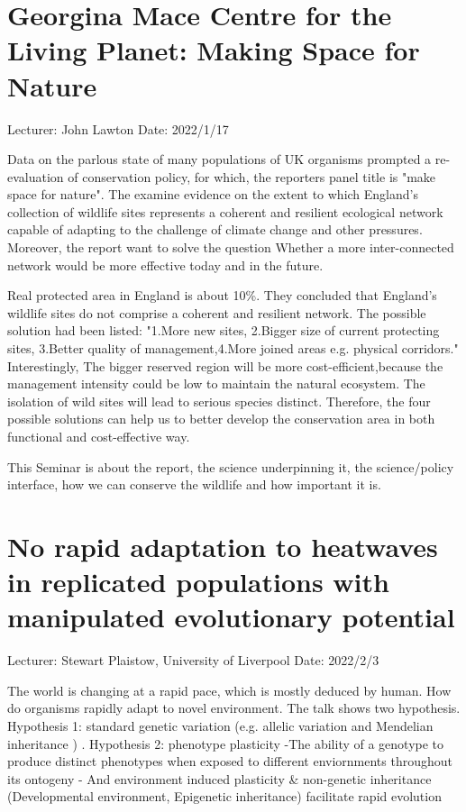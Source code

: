 \documentclass[11pt]{article}
\begin{document}
   
\newpage


\section{Georgina Mace Centre for the Living Planet: Making Space for Nature}
Lecturer: John Lawton
\newline
Date: 2022/1/17
\newline

Data on the parlous state of many populations of UK organisms prompted a re-evaluation of conservation policy, for which, the reporters panel title is "make space for nature". The examine evidence on the extent to which England's collection of wildlife sites represents a coherent and resilient ecological network capable of adapting to the challenge of climate change and other pressures. Moreover, the report want to solve the question Whether a more inter-connected network would be more effective today and in the future.

Real protected area in England is about 10\%. They concluded that England's wildlife sites do not comprise a coherent and resilient network. The possible solution had been listed: "1.More new sites, 2.Bigger size of current protecting sites, 3.Better quality of management,4.More joined areas e.g. physical corridors." Interestingly, The bigger reserved region will be more cost-efficient,because the management intensity could be low to maintain the natural ecosystem. The isolation of wild sites will lead to serious species distinct. Therefore, the four possible solutions can help us to better develop the conservation area in both functional and cost-effective way.

This Seminar is about the report, the science underpinning it, the science/policy interface, how we can conserve the wildlife and how important it is.


\newpage






\section{No rapid adaptation to heatwaves in replicated populations with manipulated evolutionary potential}
Lecturer:  Stewart Plaistow, University of Liverpool
\newline
Date: 2022/2/3
\newline

The world is changing at a rapid pace, which is mostly deduced by human. How do organisms rapidly adapt to novel environment. The talk shows two hypothesis. Hypothesis 1: standard genetic variation (e.g. allelic variation and Mendelian inheritance ) . Hypothesis 2: phenotype plasticity -The ability of a genotype to produce distinct phenotypes when exposed to different enviornments throughout its ontogeny
- And environment induced plasticity & non-genetic inheritance (Developmental environment, Epigenetic inheritance) facilitate rapid evolution
\end{document}
